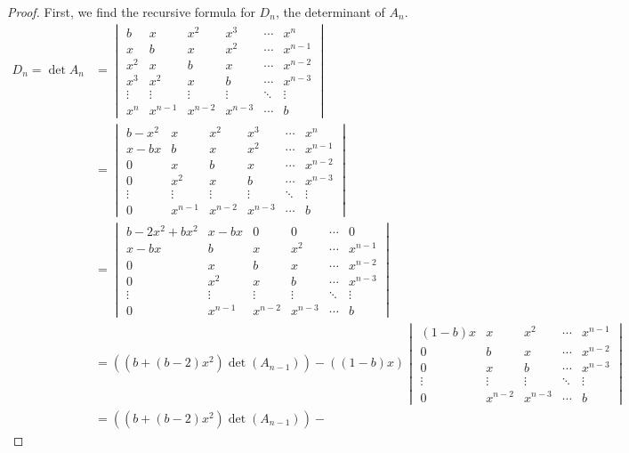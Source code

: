 \documentclass[11pt, letterpaper]{article}
\numberwithin{equation}{section}
\begin{document}
\begin{proof}
First, we find the recursive formula for $D_n$, the determinant of $A_n$.
\begin{align*}
D_n = \det A_n &= \begin{vmatrix}
b & x & x^2 & x^3 & \cdots & x^n \\
x & b & x & x^2 & \cdots & x^{n-1} \\
x^2 & x & b & x  & \cdots & x^{n-2} \\
x^3 & x^2 & x & b & \cdots & x^{n-3} \\
\vdots & \vdots & \vdots & \vdots & \ddots & \vdots \\
x^n  & x^{n-1} & x^{n-2} & x^{n-3} & \cdots & b
\end{vmatrix}\\
&= \begin{vmatrix}
b -x^2 & x & x^2 & x^3 & \cdots & x^n \\
x-bx & b & x & x^2 & \cdots & x^{n-1} \\
0 & x & b & x  & \cdots & x^{n-2} \\
0 & x^2 & x & b & \cdots & x^{n-3} \\
\vdots & \vdots & \vdots & \vdots & \ddots & \vdots \\
0  & x^{n-1} & x^{n-2} & x^{n-3} & \cdots & b
\end{vmatrix} \\
&=  \begin{vmatrix}
b -2x^2 +  bx^2 & x-bx & 0 & 0 & \cdots & 0 \\
x-bx & b & x & x^2 & \cdots & x^{n-1} \\
0 & x & b & x  & \cdots & x^{n-2} \\
0 & x^2 & x & b & \cdots & x^{n-3} \\
\vdots & \vdots & \vdots & \vdots & \ddots & \vdots \\
0  & x^{n-1} & x^{n-2} & x^{n-3} & \cdots & b
\end{vmatrix} \\
& = \left(\left(b + (b-2)x^2\right) \det (A_{n-1}) \right) - 
\left((1-b)x\right) \begin{vmatrix}
(1-b)x  & x & x^2 & \cdots & x^{n-1} \\
0  & b & x  & \cdots & x^{n-2} \\
0  & x & b & \cdots & x^{n-3} \\
\vdots & \vdots & \vdots & \ddots & \vdots \\
0  & x^{n-2} & x^{n-3} & \cdots & b
\end{vmatrix} \\
& = \left(\left(b + (b-2)x^2\right) \det (A_{n-1}) \right) - 

\end{align*}
\end{proof}
\end{document}
